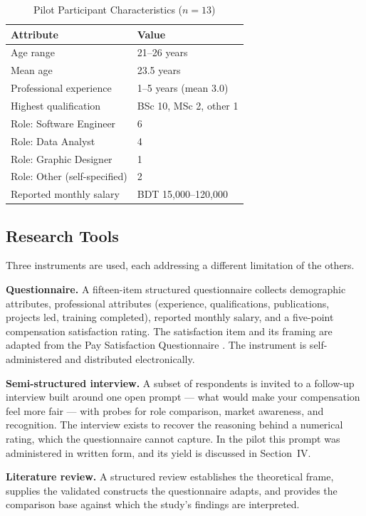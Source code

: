 \documentclass[conference]{IEEEtran}
\begin{document}
\begin{table}[htbp]
\caption{Pilot Participant Characteristics ($n=13$)}
\label{tab:demographics}
\centering
\begin{tabular}{@{}ll@{}}
\toprule
\textbf{Attribute} & \textbf{Value} \\
\midrule
Age range & 21--26 years \\
Mean age & 23.5 years \\
Professional experience & 1--5 years (mean 3.0) \\
Highest qualification & BSc 10, MSc 2, other 1 \\
Role: Software Engineer & 6 \\
Role: Data Analyst & 4 \\
Role: Graphic Designer & 1 \\
Role: Other (self-specified) & 2 \\
Reported monthly salary & BDT 15{,}000--120{,}000 \\
\bottomrule
\end{tabular}
\end{table}

\subsection{Research Tools}

Three instruments are used, each addressing a different limitation of the
others.

\textbf{Questionnaire.} A fifteen-item structured questionnaire collects
demographic attributes, professional attributes (experience,
qualifications, publications, projects led, training completed), reported
monthly salary, and a five-point compensation satisfaction rating. The
satisfaction item and its framing are adapted from the Pay Satisfaction
Questionnaire \cite{heneman1985pay}. The instrument is
self-administered and distributed electronically.

\textbf{Semi-structured interview.} A subset of respondents is invited to
a follow-up interview built around one open prompt --- what would make
your compensation feel more fair --- with probes for role comparison,
market awareness, and recognition. The interview exists to recover the
reasoning behind a numerical rating, which the questionnaire cannot
capture. In the pilot this prompt was administered in written form, and
its yield is discussed in Section~IV.

\textbf{Literature review.} A structured review establishes the
theoretical frame, supplies the validated constructs the questionnaire
adapts, and provides the comparison base against which the study's
findings are interpreted.
\end{document}
